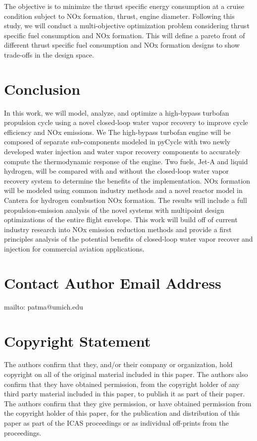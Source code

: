 \documentclass[]{icas2022}
\begin{document}
The objective is to minimize the thrust specific energy consumption at a cruise condition subject to NOx formation, thrust, engine diameter.
Following this study, we will conduct a multi-objective optimization problem considering thrust specific fuel consumption and NOx formation. 
This will define a pareto front of different thrust specific fuel consumption and NOx formation designs to show trade-offs in the design space.

\section{Conclusion}
In this work, we will model, analyze, and optimize a high-bypass turbofan propulsion cycle using a novel closed-loop water vapor recovery to improve cycle efficiency and NOx emissions. We 
The high-bypass turbofan engine will be composed of separate sub-components modeled in pyCycle with two newly developed water injection and water vapor recovery components to accurately compute the thermodynamic response of the engine. 
Two fuels, Jet-A and liquid hydrogen, will be compared with and without the closed-loop water vapor recovery system to determine the benefits of the implementation. 
NOx formation will be modeled using common industry methods and a novel reactor model in Cantera for hydrogen combustion NOx formation.
The results will include a full propulsion-emission analysis of the novel systems with multipoint design optimizations of the entire flight envelope.
This work will build off of current industry research into NOx emission reduction methods and provide a first principles analysis of the potential benefits of closed-loop water vapor recover and injection for commercial aviation applications.

\section{Contact Author Email Address}
mailto: patma@umich.edu

\section{Copyright Statement} %
\begin{small}
	The authors confirm that they, and/or their company or organization, hold copyright on all of the original material included in this paper. The authors also confirm that they have obtained permission, from the copyright holder of any third party material included in this paper, to publish it as part of their paper. The authors confirm that they give permission, or have obtained permission from the copyright holder of this paper, for the publication and distribution of this paper as part of the ICAS proceedings or as individual off-prints from the proceedings.
\end{small}



\end{document}

